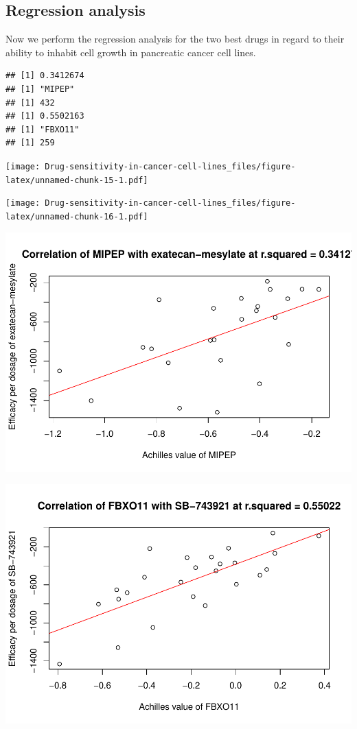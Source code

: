 \documentclass[
]{article}
\begin{document}
\hypertarget{regression-analysis-1}{%
\subsection{Regression analysis}\label{regression-analysis-1}}

Now we perform the regression analysis for the two best drugs in regard
to their ability to inhabit cell growth in pancreatic cancer cell lines.

\begin{verbatim}
## [1] 0.3412674
## [1] "MIPEP"
## [1] 432
## [1] 0.5502163
## [1] "FBXO11"
## [1] 259
\end{verbatim}

\texttt{[image: Drug-sensitivity-in-cancer-cell-lines\_files/figure-latex/unnamed-chunk-15-1.pdf]}

\texttt{[image: Drug-sensitivity-in-cancer-cell-lines\_files/figure-latex/unnamed-chunk-16-1.pdf]}

\includegraphics{Drug-sensitivity-in-cancer-cell-lines_files/figure-latex/unnamed-chunk-17-1.pdf}

\includegraphics{Drug-sensitivity-in-cancer-cell-lines_files/figure-latex/unnamed-chunk-18-1.pdf}
\end{document}
